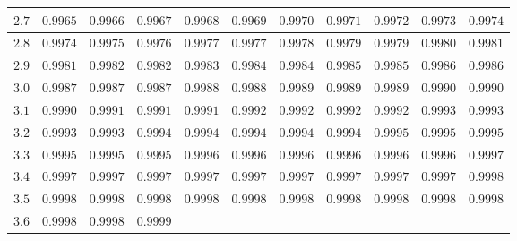 \begin{customTableWrapper}{1.3}
\begin{longtable}{|l|l|l|l|l|l|l|l|l|l|l|}
    $\mathbf{2.7}$  & ${0.9965}$   & ${0.9966}$   & ${0.9967}$   & ${0.9968}$   & ${0.9969}$   & ${0.9970}$   & ${0.9971}$   & ${0.9972}$   & ${0.9973}$   & ${0.9974}$   \\ \hline
    
    $\mathbf{2.8}$  & ${0.9974}$   & ${0.9975}$   & ${0.9976}$   & ${0.9977}$   & ${0.9977}$   & ${0.9978}$   & ${0.9979}$   & ${0.9979}$   & ${0.9980}$   & ${0.9981}$   \\ \hline
    
    $\mathbf{2.9}$  & ${0.9981}$   & ${0.9982}$   & ${0.9982}$   & ${0.9983}$   & ${0.9984}$   & ${0.9984}$   & ${0.9985}$   & ${0.9985}$   & ${0.9986}$   & ${0.9986}$   \\ \hline
    
    $\mathbf{3.0}$  & ${0.9987}$   & ${0.9987}$   & ${0.9987}$   & ${0.9988}$   & ${0.9988}$   & ${0.9989}$   & ${0.9989}$   & ${0.9989}$   & ${0.9990}$   & ${0.9990}$   \\ \hline
    
    $\mathbf{3.1}$  & ${0.9990}$   & ${0.9991}$   & ${0.9991}$   & ${0.9991}$   & ${0.9992}$   & ${0.9992}$   & ${0.9992}$   & ${0.9992}$   & ${0.9993}$   & ${0.9993}$   \\ \hline
    
    $\mathbf{3.2}$  & ${0.9993}$   & ${0.9993}$   & ${0.9994}$   & ${0.9994}$   & ${0.9994}$   & ${0.9994}$   & ${0.9994}$   & ${0.9995}$   & ${0.9995}$   & ${0.9995}$   \\ \hline
    
    $\mathbf{3.3}$  & ${0.9995}$   & ${0.9995}$   & ${0.9995}$   & ${0.9996}$   & ${0.9996}$   & ${0.9996}$   & ${0.9996}$   & ${0.9996}$   & ${0.9996}$   & ${0.9997}$   \\ \hline
    
    $\mathbf{3.4}$  & ${0.9997}$   & ${0.9997}$   & ${0.9997}$   & ${0.9997}$   & ${0.9997}$   & ${0.9997}$   & ${0.9997}$   & ${0.9997}$   & ${0.9997}$   & ${0.9998}$   \\ \hline
    
    $\mathbf{3.5}$  & ${0.9998}$   & ${0.9998}$   & ${0.9998}$   & ${0.9998}$   & ${0.9998}$   & ${0.9998}$   & ${0.9998}$   & ${0.9998}$   & ${0.9998}$   & ${0.9998}$   \\ \hline
    
    $\mathbf{3.6}$  & ${0.9998}$   & ${0.9998}$   & ${0.9999}$   &         &           &       &           &       &           &       \\ \hline
\end{longtable}
\end{customTableWrapper}


\changefontsizes{11pt}










